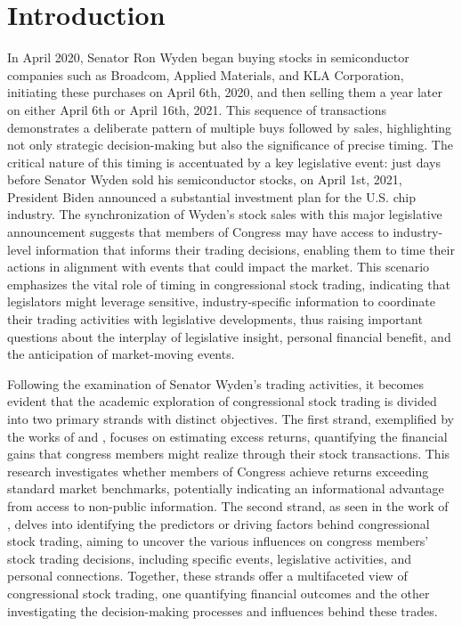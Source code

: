 \documentclass[15pt,letterpaper]{article}
\newcommand\spacingset[1]{\renewcommand{\baselinestretch}
{#1}\small\normalsize}
\begin{document}
\section{Introduction}
\spacingset{2} %

In April 2020, Senator Ron Wyden began buying stocks in semiconductor companies such as Broadcom, Applied Materials, and KLA Corporation, initiating these purchases on April 6th, 2020, and then selling them a year later on either April 6th or April 16th, 2021. This sequence of transactions demonstrates a deliberate pattern of multiple buys followed by sales, highlighting not only strategic decision-making but also the significance of precise timing. The critical nature of this timing is accentuated by a key legislative event: just days before Senator Wyden sold his semiconductor stocks, on April 1st, 2021, President Biden announced a substantial investment plan for the U.S. chip industry. The synchronization of Wyden's stock sales with this major legislative announcement suggests that members of Congress may have access to industry-level information that informs their trading decisions, enabling them to time their actions in alignment with events that could impact the market. This scenario emphasizes the vital role of timing in congressional stock trading, indicating that legislators might leverage sensitive, industry-specific information to coordinate their trading activities with legislative developments, thus raising important questions about the interplay of legislative insight, personal financial benefit, and the anticipation of market-moving events.

Following the examination of Senator Wyden's trading activities, it becomes evident that the academic exploration of congressional stock trading is divided into two primary strands with distinct objectives. The first strand, exemplified by the works of \cite{zi24, zi11} and \cite{eg13}, focuses on estimating excess returns, quantifying the financial gains that congress members might realize through their stock transactions. This research investigates whether members of Congress achieve returns exceeding standard market benchmarks, potentially indicating an informational advantage from access to non-public information. The second strand, as seen in the work of \cite{eg14}, delves into identifying the predictors or driving factors behind congressional stock trading, aiming to uncover the various influences on congress members’ stock trading decisions, including specific events, legislative activities, and personal connections. Together, these strands offer a multifaceted view of congressional stock trading, one quantifying financial outcomes and the other investigating the decision-making processes and influences behind these trades.
\end{document}
